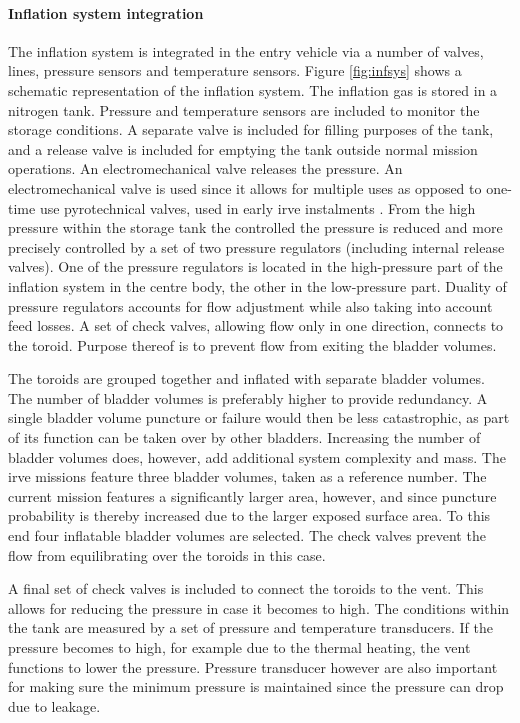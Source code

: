 \paragraph{Inflation system integration}
The inflation system is integrated in the entry vehicle via a number of valves, lines, pressure sensors and temperature sensors. Figure \ref{fig:infsys} shows a schematic representation of the inflation system. The inflation gas is stored in a nitrogen tank. Pressure and temperature sensors are included to monitor the storage conditions. A separate valve is included for filling purposes of the tank, and a release valve is included for emptying the tank outside normal mission operations. An electromechanical valve releases the pressure. An electromechanical valve is used since it allows for multiple uses as opposed to one-time use pyrotechnical valves, used in early \gls{irve} instalments \cite{Hughes2005}. From the high pressure within the storage tank the controlled the pressure is reduced and more precisely controlled by a set of two pressure regulators (including internal release valves). One of the pressure regulators is located in the high-pressure part of the inflation system in the centre body, the other in the low-pressure part. Duality of pressure regulators accounts for flow adjustment while also taking into account feed losses. A set of check valves, allowing flow only in one direction, connects to the toroid. Purpose thereof is to prevent flow from exiting the bladder volumes. 

The toroids are grouped together and inflated with separate bladder volumes.  The number of bladder volumes is preferably higher to provide redundancy. A single bladder volume puncture or failure would then be less catastrophic, as part of its function can be taken over by other bladders. Increasing the number of bladder volumes does, however, add additional system complexity and mass. The \gls{irve} missions feature three bladder volumes, taken as a reference number. The current mission features a significantly larger area, however, and since puncture probability is thereby increased due to the larger exposed surface area. To this end four inflatable bladder volumes are selected. The check valves prevent the flow from equilibrating over the toroids in this case.

A final set of check valves is included to connect the toroids to the vent. This allows for reducing the pressure in case it becomes to high. The conditions within the tank are measured by a set of pressure and temperature transducers. If the pressure becomes to high, for example due to the thermal heating, the vent functions to lower the pressure. Pressure transducer however are also important for making sure the minimum pressure is maintained since the pressure can drop due to leakage. 

